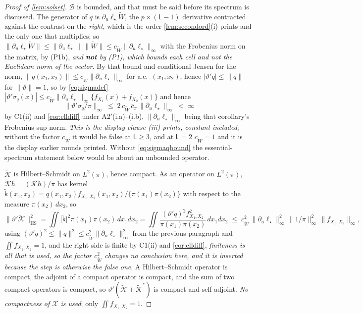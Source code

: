 \begin{proof}[Proof of \cref{lem:solset}]
$\mathcal B$ is bounded, and that must be said before its spectrum is discussed. The generator of
$q$ is $\partial_u\ell_\star\widetilde W$, the $p\times(\mathsf L-1)$ derivative contracted against the
contrast on the \emph{right}, which is the order \cref{lem:secondord}\textup{(i)} prints and the only one
that multiplies; so $\|\partial_u\ell_\star\widetilde W\|\le\|\partial_u\ell_\star\|\,\|\widetilde W\|
\le c_{\widetilde W}\|\partial_u\ell_\star\|_\infty$ with the Frobenius norm on the matrix, by
\textup{(P1b)}, \emph{and \textbf{not} by \textup{(P1)}, which bounds each cell and not the Euclidean
norm of the vector}. By that bound and
conditional Jensen for the norm, $\|q(x_1,x_2)\|\le c_{\widetilde W}\|\partial_u\ell_\star\|_\infty$ for
a.e.\ $(x_1,x_2)$; hence $|\vartheta'q|\le\|q\|$ for $\|\vartheta\|=1$, so by
\eqref{eq:sigmadef}
$|\vartheta'\sigma_q(x)|\le c_{\widetilde W}\|\partial_u\ell_\star\|_\infty\{f_{X_1}(x)+f_{X_2}(x)\}$ and
hence
\begin{equation}\label{eq:sigmaqbound}
\big\|\vartheta'\sigma_q/\pi\big\|_\infty\;\le\;2\,c_{\widetilde W}\,\bar c_\pi\,\big\|\partial_u\ell_\star\big\|_\infty\;<\;\infty
\end{equation}
by C1(ii) and \cref{cor:elldiff} under A2$'$(i.a)--(i.b), $\|\partial_u\ell_\star\|_\infty$ being that
corollary's Frobenius sup-norm. \emph{This is the display clause \textup{(iii)} prints, constant included};
without the factor $c_{\widetilde W}$ it would be false at $\mathsf L\ge3$, and at $\mathsf L=2$
$c_{\widetilde W}=1$ and it is the display earlier rounds printed. Without \eqref{eq:sigmaqbound} the
essential-spectrum statement below would be about an unbounded operator.

$\tilde{\mathcal K}$ is Hilbert--Schmidt on $L^{2}(\pi)$, hence compact.
As an operator on $L^{2}(\pi)$, $\tilde{\mathcal K}h=(\mathcal Kh)/\pi$ has
kernel $\tilde{\mathsf k}(x_1,x_2)=q(x_1,x_2)f_{X_1,X_2}(x_1,x_2)/\{\pi(x_1)\pi(x_2)\}$ with respect to
the measure $\pi(x_2)\,dx_2$, so
\[
\big\|\vartheta'\tilde{\mathcal K}\big\|^{2}_{\mathrm{HS}}
=\iint\big|\tilde{\mathsf k}\big|^{2}\pi(x_1)\pi(x_2)\,dx_1dx_2
=\iint\frac{(\vartheta'q)^{2}f_{X_1,X_2}^{2}}{\pi(x_1)\pi(x_2)}\,dx_1dx_2
\;\le\;c_{\widetilde W}^{2}\,\big\|\partial_u\ell_\star\big\|_\infty^{2}\,\big\|1/\pi\big\|_\infty^{2}\,\big\|f_{X_1,X_2}\big\|_\infty ,
\]
using $(\vartheta'q)^{2}\le\|q\|^{2}\le c_{\widetilde W}^{2}\|\partial_u\ell_\star\|_\infty^{2}$ from the
previous paragraph and $\iint f_{X_1,X_2}=1$, and the right side is finite by C1(ii) and
\cref{cor:elldiff}, \emph{finiteness is all that is used, so the factor $c_{\widetilde W}^{2}$ changes
no conclusion here, and it is inserted because the step is otherwise the false one}. A
Hilbert--Schmidt operator is compact, the adjoint of a compact operator is compact, and the sum of two
compact operators is compact, so $\vartheta'(\tilde{\mathcal K}+\tilde{\mathcal K}^\ast)$ is compact and
self-adjoint. \emph{No compactness of $\mathcal X$ is used}; only $\iint f_{X_1,X_2}=1$.


\end{proof}
